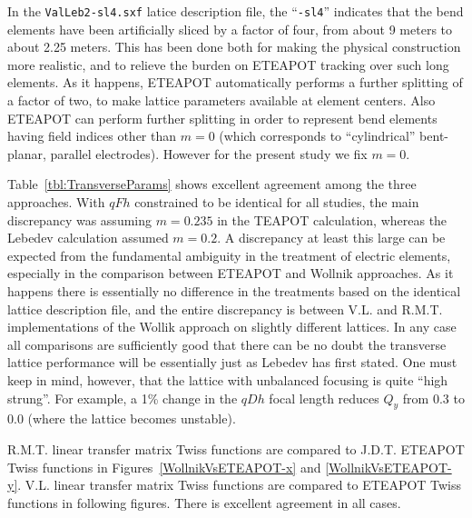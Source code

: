 \documentclass[12]{article}
\begin{document}
In the {\tt ValLeb2-sl4.sxf} latice description file, the ``{\tt -sl4}'' indicates
that the bend elements have been artificially sliced by a factor of four, from
about 9 meters to about 2.25 meters. This has been done both for making the
physical construction more realistic, and to relieve the burden on ETEAPOT tracking
over such long elements. As it happens, ETEAPOT automatically performs a further
splitting of a factor of two, to make lattice parameters available at element
centers. Also ETEAPOT can perform further splitting in order to represent bend
elements having field indices other than $m=0$ (which corresponds to ``cylindrical''
bent-planar, parallel electrodes). However for the present study we fix $m=0$.

Table~\ref{tbl:TransverseParams} shows excellent agreement among the three approaches.
With $qFh$ constrained to be identical for all studies, the main discrepancy was
assuming $m=0.235$ in the TEAPOT calculation, whereas the Lebedev calculation
assumed $m=0.2$.
A discrepancy at least this large can be expected from the fundamental ambiguity
in the treatment of electric elements, especially in the comparison between
ETEAPOT and Wollnik approaches.  As it happens there is essentially no
difference in the treatments based on the identical lattice description file, 
and the entire discrepancy is between V.L. and R.M.T. implementations of 
the Wollik approach on slightly different lattices. In any case all
comparisons are sufficiently good that there can be no doubt the
transverse lattice performance will be essentially just as Lebedev has 
first stated. One must keep in mind, however, that the lattice with 
unbalanced focusing is quite ``high strung''.  For example, a 1\%
change in the $qDh$ focal length reduces $Q_y$ from 0.3 to 0.0 (where
the lattice becomes unstable). 

R.M.T. linear transfer matrix Twiss functions are compared to J.D.T. ETEAPOT
Twiss functions in Figures~\ref{WollnikVsETEAPOT-x} and \ref{WollnikVsETEAPOT-y}. 
V.L. linear transfer matrix Twiss functions are compared to ETEAPOT
Twiss functions in following figures. 
There is excellent agreement in all cases.
\end{document}

